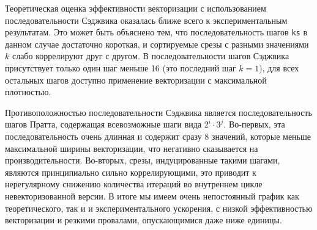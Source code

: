 Теоретическая оценка эффективности векторизации с использованием последовательности Сэджвика оказалась ближе всего к экспериментальным результатам.
Это может быть объяснено тем, что последовательность шагов \texttt{ks} в данном случае достаточно короткая, и сортируемые срезы с разными значениями $k$ слабо коррелируют друг с другом.
В последовательности шагов Сэджвика присутствует только один шаг меньше 16 (это последний шаг $k = 1$), для всех остальных шагов доступно применение векторизации с максимальной плотностью.

Противоположностью последовательности Сэджвика является последовательность шагов Пратта, содержащая всевозможные шаги вида $2^i \cdot 3^j$.
Во-первых, эта последовательность очень длинная и содержит сразу 8 значений, которые меньше максимальной ширины векторизации, что негативно сказывается на производительности.
Во-вторых, срезы, индуцированные такими шагами, являются принципиально сильно коррелирующими, это приводит к нерегулярному снижению количества итераций во внутреннем цикле невекторизованной версии.
В итоге мы имеем очень непостоянный график как теоретического, так и и экспериментального ускорения, с низкой эффективностью векторизации и резкими провалами, опускающимися даже ниже единицы.
